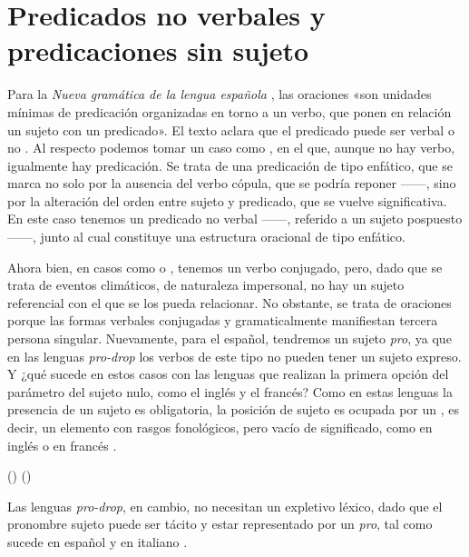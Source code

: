 \section{Predicados no verbales y predicaciones sin sujeto}\label{sec:06-noverbales}

Para la \textit{Nueva gramática de la lengua española} \parencite[§\,1.13a]{rae2025},
las oraciones «son unidades mínimas de predicación organizadas en torno a un
verbo, que ponen en relación un sujeto con un predicado». El texto aclara que el
predicado puede ser verbal o no \parencite[§\,1.12d]{rae2025}. Al respecto
podemos tomar un caso como , en el que, aunque no
hay verbo, igualmente hay predicación. Se trata de una predicación de tipo
enfático, que se marca no solo por la ausencia del verbo cópula, que se podría
reponer ------, sino por la alteración del
orden entre sujeto y predicado, que se vuelve significativa. En este caso
tenemos un predicado no verbal ------, referido a un sujeto
pospuesto ------, junto al cual constituye una estructura
oracional de tipo enfático.

Ahora bien, en casos como  o , tenemos un verbo
conjugado, pero, dado que se trata de eventos climáticos, de naturaleza
impersonal, no hay un sujeto referencial con el que se los pueda relacionar. No
obstante, se trata de oraciones porque las formas verbales conjugadas
 y  gramaticalmente manifiestan tercera persona
singular. Nuevamente, para el español, tendremos un sujeto \textit{pro}, ya que
en las lenguas \textit{pro-drop} los verbos de este tipo no pueden tener un
sujeto expreso. Y ¿qué sucede en estos casos con las lenguas que realizan la
primera opción del parámetro del sujeto nulo, como el inglés y el francés? Como
en estas lenguas la presencia de un sujeto es obligatoria, la posición de sujeto
es ocupada por un , es decir, un elemento con rasgos
fonológicos, pero vacío de significado, como  en inglés
 o  en francés .

\begin{exe}
  \ex\label{ex:06-it}  ()
  \ex\label{ex:06-il}  ()
\end{exe}

Las lenguas \textit{pro-drop}, en cambio, no necesitan un expletivo léxico, dado
que el pronombre sujeto puede ser tácito y estar representado por un
\textit{pro}, tal como sucede en español  y en
italiano .

